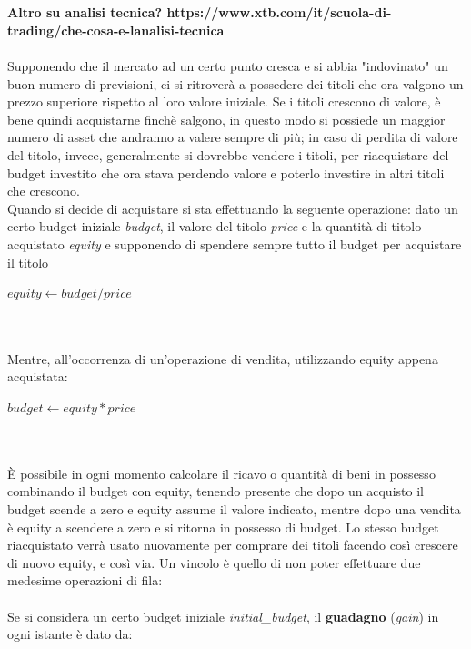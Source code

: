 \documentclass{article}
\begin{document}
		\\~\\
		\textbf{Altro su analisi tecnica? https://www.xtb.com/it/scuola-di-trading/che-cosa-e-lanalisi-tecnica}
		\\~\\
		Supponendo che il mercato ad un certo punto cresca e si abbia "indovinato" un buon numero di previsioni, ci si ritroverà a possedere dei titoli che ora valgono un prezzo superiore rispetto al loro valore iniziale. Se i titoli crescono di valore, è bene quindi acquistarne finchè salgono, in questo modo si possiede un maggior numero di asset che andranno a valere sempre di più; in caso di perdita di valore del titolo, invece, generalmente si dovrebbe vendere i titoli, per riacquistare del budget investito che ora stava perdendo valore e poterlo investire in altri titoli che crescono.\\
		Quando si decide di acquistare si sta effettuando la seguente operazione: dato un certo budget iniziale \textit{budget}, il valore del titolo \textit{price} e la quantità di titolo acquistato \textit{equity} e supponendo di spendere sempre tutto il budget per acquistare il titolo
		\\
		
	    \begin{algorithmic}                             
			\State $equity\gets budget/price$
		\end{algorithmic}

		\\~\\
		Mentre, all'occorrenza di un'operazione di vendita, utilizzando equity appena acquistata:\\

 		\begin{algorithmic}                               
			\State $budget\gets equity * price$
		\end{algorithmic}

		\\~\\
		È possibile in ogni momento calcolare il ricavo o quantità di beni in possesso combinando il budget con equity, tenendo presente che dopo un acquisto il budget scende a zero e equity assume il valore indicato, mentre dopo una vendita è equity a scendere a zero e si ritorna in possesso di budget. Lo stesso budget riacquistato verrà usato nuovamente per comprare dei titoli facendo così crescere di nuovo equity, e così via. Un vincolo è quello di non poter effettuare due medesime operazioni di fila: 
		\\~\\
		Se si considera un certo budget iniziale \textit{initial\_budget}, il \textbf{guadagno} (\textit{gain}) in ogni istante è dato da:
		\\
		
\end{document}
